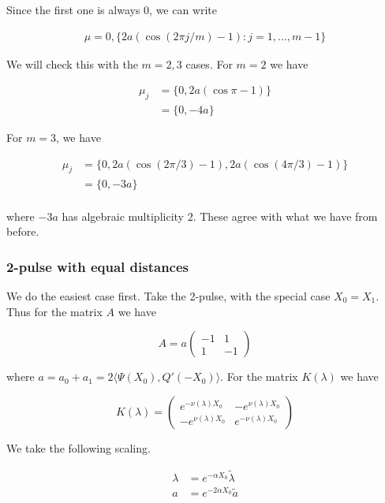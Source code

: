 \documentclass[12pt]{article}
\begin{document}
Since the first one is always 0, we can write

\begin{align*}
\mu = 0, \{ 2 a( \cos( 2 \pi j/m ) - 1 ) : j = 1, \dots, m-1 \}
\end{align*}

We will check this with the $m = 2, 3$ cases. For $m = 2$ we have

\begin{align*}
\mu_j &= \{ 0, 2 a( \cos \pi - 1 ) \} \\
&= \{ 0, -4 a\}
\end{align*}

For $m = 3$, we have

\begin{align*}
\mu_j &= \{ 0, 2 a( \cos (2 \pi /3) - 1 ), 2 a( \cos (4 \pi /3) - 1 ) \} \\
&= \{ 0, -3a \} \\
\end{align*}

where $-3a$ has algebraic multiplicity 2. These agree with what we have from before.

\subsubsection{2-pulse with equal distances}

We do the easiest case first. Take the 2-pulse, with the special case $X_0 = X_1$. Thus for the matrix $A$ we have

\[
A = a \begin{pmatrix}
-1 & 1 \\
1 & -1
\end{pmatrix}
\]

where $a = a_0 + a_1 = 2 \langle \Psi(X_0), Q'(-X_0) \rangle$. For the matrix $K(\lambda)$ we have

\begin{equation}
K(\lambda) = 
\begin{pmatrix}
e^{-\nu(\lambda)X_0} & -e^{\nu(\lambda)X_0} \\
-e^{\nu(\lambda)X_0} & e^{-\nu(\lambda)X_0}
\end{pmatrix}
\end{equation}

We take the following scaling.

\begin{align*}
\lambda &= e^{-\alpha X_0} \tilde{\lambda} \\
a &= e^{-2 \alpha X_0} \tilde{a}
\end{align*}
\end{document}

